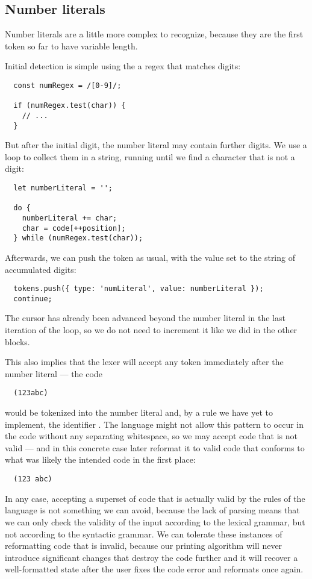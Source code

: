 \subsection{Number literals}
Number literals are a little more complex to recognize,
because they are the first token so far to have variable length.

Initial detection is simple using the a regex that matches digits:
\begin{verbatim}
  const numRegex = /[0-9]/;

  if (numRegex.test(char)) {
    // ...
  }
\end{verbatim}

But after the initial digit, the number literal may contain further digits.
We use a loop to collect them in a string,
running until we find a character that is not a digit:
\begin{verbatim}
  let numberLiteral = '';

  do {
    numberLiteral += char;
    char = code[++position];
  } while (numRegex.test(char));
\end{verbatim}

Afterwards, we can push the token as usual,
with the value set to the string of accumulated digits:
\begin{verbatim}
  tokens.push({ type: 'numLiteral', value: numberLiteral });
  continue;
\end{verbatim}
The  cursor has already been advanced
beyond the number literal in the last iteration of the loop,
so we do not need to increment it like we did in the other blocks.

This also implies that the lexer will accept any token
immediately after the number literal --- the code
\begin{verbatim}
  (123abc)
\end{verbatim}
would be tokenized into the number literal 
and, by a rule we have yet to implement, the identifier .
The language might not allow this pattern to occur in the code
without any separating whitespace, so we may accept code that is not valid ---
and in this concrete case later reformat it to valid code that
conforms to what was likely the intended code in the first place:
\begin{verbatim}
  (123 abc)
\end{verbatim}

In any case, accepting a superset of code that is actually valid
by the rules of the language is not something we can avoid,
because the lack of parsing means that
we can only check the validity of the input
according to the lexical grammar,
but not according to the syntactic grammar.
We can tolerate these instances of reformatting code that is invalid,
because our printing algorithm will never introduce significant changes
that destroy the code further and it will recover a well-formatted state
after the user fixes the code error and reformats once again.
